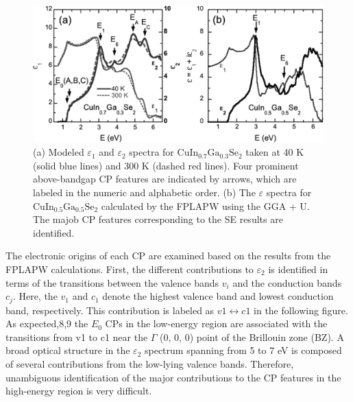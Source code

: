 \documentclass[a4paper, 12pt, titlepage,oneside,drop]{kthesis}
\begin{document}
\begin{figure}[H]
\begin{center}
\includegraphics[scale=.15]{paper3figure1.png}
\end{center}
\caption{ (a) Modeled $\varepsilon_1$ and $\varepsilon_2$ spectra for $\mathrm {CuIn_{0.7}Ga_{0.3}Se_2}$ 
 taken at 40 K (solid blue lines) and 300 K (dashed red lines).
 Four prominent above-bandgap CP features are indicated by arrows, which are labeled in the numeric and alphabetic order. 
 (b) The $\varepsilon$ spectra for $\mathrm {CuIn_{0.5}Ga_{0.5}Se_2}$
 calculated by the FPLAPW using the GGA + U. The majob CP features corresponding to the SE results are identified. }
\label{paper3figure1}
\end{figure} 


The electronic origins of each CP are examined based on the results from the FPLAPW calculations. First, the different contributions to $\varepsilon_2$ is identified in terms of
 the transitions between the valence bands $v_i$ and the conduction bands $c_j$. Here, the $v_1$ and $c_1$ denote the highest valence band and lowest conduction band, 
respectively. This contribution is labeled as $v1 \leftrightarrow c1$ in the following figure. As expected,8,9 the $E_0$ CPs in the low-energy region are associated with the transitions from v1 
to c1 near the $\Gamma$ (0, 0, 0) point of the Brillouin zone (BZ). A broad optical structure in the $\varepsilon_2$ spectrum spanning from 5 to 7 eV is composed of several contributions
 from the low-lying valence bands. Therefore, unambiguous identification of the major contributions to the CP features in the high-energy region is very difficult.
\end{document}
